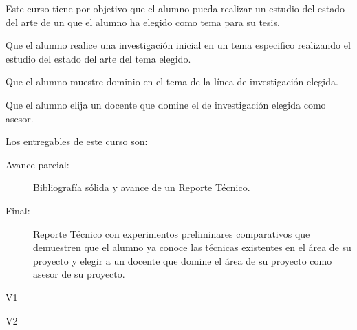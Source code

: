 \begin{syllabus}


\begin{justification}
Este curso tiene por objetivo que el alumno pueda realizar un estudio del estado del arte de un que el alumno ha elegido como tema para su tesis.
\end{justification}

\begin{goals}
\item Que el alumno realice una investigación inicial en un tema especifico realizando el estudio del estado del arte del tema elegido.
\item Que el alumno muestre dominio en el tema de la línea de investigación elegida.
\item Que el alumno elija un docente que domine el de investigación elegida como asesor. 
\item Los entregables de este curso son:
	\begin{description}
		\item [Avance parcial:] Bibliografía sólida y avance de un Reporte Técnico.
		\item [Final:] Reporte Técnico con experimentos preliminares comparativos que demuestren que el alumno ya conoce las técnicas existentes en el área de su proyecto y elegir a un docente que domine el área de su proyecto como asesor de su proyecto.
	\end{description}
\end{goals}

\begin{outcomes}{V1}
\item {}
\item {}
\item {}
\item {}
\item {}
\item {}
\item {}
\item {}
\end{outcomes}

\begin{outcomes}{V2}
\item {}
\item {}
\item {}
\item {}
\end{outcomes}


\end{syllabus}
